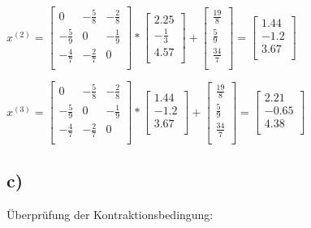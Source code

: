 \documentclass{article}
\begin{document}
\(
x^{(2)} = 
\begin{bmatrix} 
0 & -\frac{5}{8} & -\frac{2}{8} \\
-\frac{5}{9} & 0 & -\frac{1}{9} \\
-\frac{4}{7} & -\frac{2}{7} & 0 \\
\end{bmatrix}
*
\begin{bmatrix} 
2.25\\
-\frac{1}{3}\\
4.57\\
\end{bmatrix}
+
\begin{bmatrix} 
\frac{19}{8}\\
\frac{5}{9}\\
\frac{34}{7}\\
\end{bmatrix}
=
\begin{bmatrix} 
1.44\\
-1.2\\
3.67\\
\end{bmatrix}
\)

\(
x^{(3)} = 
\begin{bmatrix} 
0 & -\frac{5}{8} & -\frac{2}{8} \\
-\frac{5}{9} & 0 & -\frac{1}{9} \\
-\frac{4}{7} & -\frac{2}{7} & 0 \\
\end{bmatrix}
*
\begin{bmatrix} 
1.44\\
-1.2\\
3.67\\
\end{bmatrix}
+
\begin{bmatrix} 
\frac{19}{8}\\
\frac{5}{9}\\
\frac{34}{7}\\
\end{bmatrix}
=
\begin{bmatrix} 
2.21\\
-0.65\\
4.38\\
\end{bmatrix}
\)

\newpage
\subsection*{c)}

Überprüfung der Kontraktionsbedingung:
\end{document}
